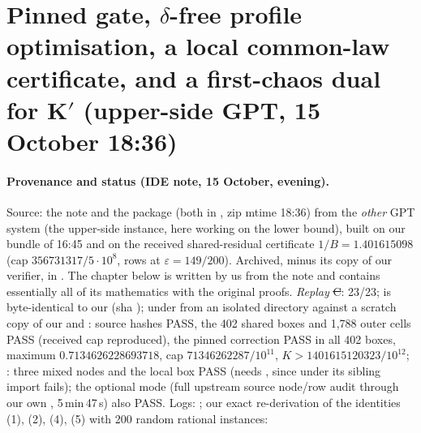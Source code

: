 \section{Pinned gate, $\delta$-free profile optimisation, a local common-law certificate, and a first-chaos dual for K$'$ (upper-side GPT, 15 October 18:36)}\label{ch:pinned}

\paragraph{Provenance and status (IDE note, 15 October, evening).} Source: the note  and the package 
(both in , zip mtime 18:36) from the \emph{other} GPT system (the upper-side instance, here working on the lower bound), built on our bundle of 16:45 and on the received
shared-residual certificate $1/B=1.401615098$ (cap $356731317/5\cdot10^8$, rows at $\varepsilon=149/200$). Archived, minus its copy of our verifier, in
. The chapter below is written by us from the note and contains essentially all of its mathematics with the
original proofs. \emph{Replay} \st{C}:  23/23;  is byte-identical to our  (sha );
 under  from an isolated directory against a scratch copy of our  and : source hashes PASS, the 402 shared boxes and 1,788
outer cells PASS (received cap reproduced), the pinned correction PASS in all 402 boxes, maximum $0.7134626228693718$, cap $71346262287/10^{11}$, $K>1401615120323/10^{12}$;
: three mixed nodes and the local box PASS (needs , since under  its sibling import fails); the optional  mode (full upstream source node/row audit through our own , 5\,min\,47\,s) also PASS. Logs: ; our exact re-derivation of the identities (1), (2), (4), (5) with 200 random rational instances:
